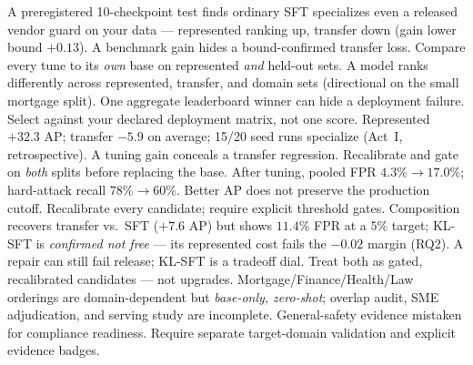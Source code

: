 \begin{tcbraster}[raster columns=2,raster equal height=rows,raster column skip=6pt,raster row skip=6pt]
    {A preregistered 10-checkpoint test finds ordinary SFT specializes even a released vendor guard on your data --- represented ranking up, transfer down (gain lower bound $+0.13$).}
    {A benchmark gain hides a bound-confirmed transfer loss.}
    {Compare every tune to its \emph{own} base on represented \emph{and} held-out sets.}
    {A model ranks differently across represented, transfer, and domain sets (directional on the small mortgage split).}
    {One aggregate leaderboard winner can hide a deployment failure.}
    {Select against your declared deployment matrix, not one score.}
    {Represented $+32.3$ AP; transfer $-5.9$ on average; 15/20 seed runs specialize (Act~I, retrospective).}
    {A tuning gain conceals a transfer regression.}
    {Recalibrate and gate on \emph{both} splits before replacing the base.}
    {After tuning, pooled FPR $4.3\%\!\to\!17.0\%$; hard-attack recall $78\%\!\to\!60\%$.}
    {Better AP does not preserve the production cutoff.}
    {Recalibrate every candidate; require explicit threshold gates.}
    {Composition recovers transfer vs.\ SFT ($+7.6$ AP) but shows $11.4\%$ FPR at a $5\%$ target; KL-SFT is \emph{confirmed not free} --- its represented cost fails the $-0.02$ margin (RQ2).}
    {A repair can still fail release; KL-SFT is a tradeoff dial.}
    {Treat both as gated, recalibrated candidates --- not upgrades.}
    {Mortgage/Finance/Health/Law orderings are domain-dependent but \emph{base-only, zero-shot}; overlap audit, SME adjudication, and serving study are incomplete.}
    {General-safety evidence mistaken for compliance readiness.}
    {Require separate target-domain validation and explicit evidence badges.}
\end{tcbraster}

\smallskip


